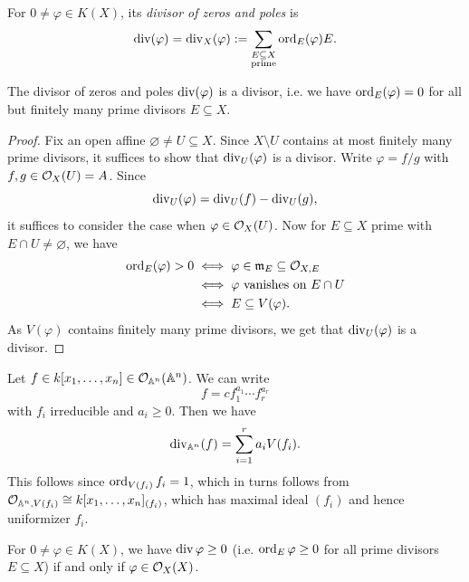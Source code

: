 \begin{definition}
  For $0 \ne \varphi \in K(X)$, its
  \emph{divisor of zeros and poles} is
  \[
    \operatorname{div}(\varphi) = \operatorname{div}_X(\varphi)
    := \sum_{\substack{E \subseteq X \\ \text{prime}}} \operatorname{ord}_E(\varphi) E.
  \]
\end{definition}

\begin{prop}
  The divisor of zeros and poles
  $\operatorname{div}(\varphi)$ is a divisor, i.e. we have
  $\operatorname{ord}_E(\varphi) = 0$ for all but finitely
  many prime divisors $E \subseteq X$.
\end{prop}

\begin{proof}
  Fix an open affine $\varnothing \ne U \subseteq X$.
  Since $X \setminus U$ contains at most
  finitely many prime divisors, it suffices
  to show that $\operatorname{div}_U(\varphi)$
  is a divisor. Write
  $\varphi = f / g$ with
  $f, g \in \mathcal{O}_X(U) = A$. Since
  \[
    \operatorname{div}_U(\varphi) = \operatorname{div}_U(f) - \operatorname{div}_U(g),
  \]
  it suffices to consider the case when
  $\varphi \in \mathcal{O}_X(U)$. Now for
  $E \subseteq X$ prime with
  $E \cap U \ne \varnothing$, we have
  \begin{align*}
    \operatorname{ord}_E(\varphi) > 0
    &\iff \varphi \in \mathfrak{m}_E \subseteq \mathcal{O}_{X, E} \\
    &\iff \varphi \text{ vanishes on } E \cap U \\
    &\iff E \subseteq V(\varphi).
  \end{align*}
  As $V(\varphi)$ contains finitely many
  prime divisors,
  we get that $\operatorname{div}_U(\varphi)$
  is a divisor.
\end{proof}

\begin{example}
  Let $f \in k[x_1, \dots, x_n] \in \mathcal{O}_{\mathbb{A}^n}(\mathbb{A}^n)$.
  We can write
  \[
    f = cf_1^{a_1} \cdots f_r^{a_r}
  \]
  with $f_i$ irreducible and  $a_i \ge 0$.
  Then we have
  \[
    \operatorname{div}_{\mathbb{A}^n}(f) = \sum_{i = 1}^r a_i V(f_i).
  \]
  This follows since $\operatorname{ord}_{V(f_i)} f_i = 1$,
  which in turns follows from
  $\mathcal{O}_{\mathbb{A}^n, V(f_i)} \cong k[x_1, \dots, x_n]_{(f_i)}$,
  which has maximal ideal
  $(f_i)$ and hence uniformizer $f_i$.
\end{example}

\begin{prop}
  For $0 \ne \varphi \in K(X)$, we have
  $\operatorname{div} \varphi \ge 0$ (i.e.
  $\operatorname{ord}_E \varphi \ge 0$ for all prime
  divisors $E \subseteq X$)
  if and only if $\varphi \in \mathcal{O}_X(X)$.
\end{prop}

